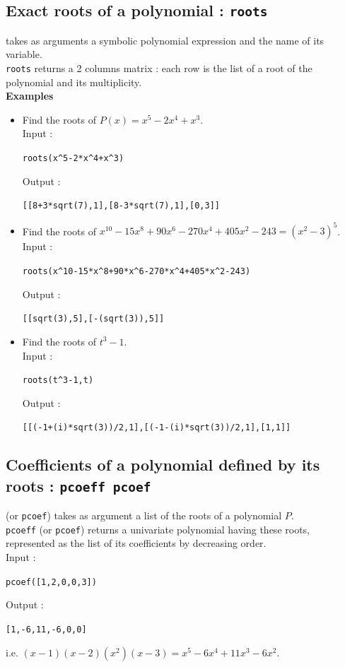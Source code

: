 \documentclass[a4paper,11pt]{book}
\begin{document}
\subsection{Exact roots of a polynomial : {\tt roots}}
 takes as arguments a symbolic
polynomial expression and the name of its variable.\\
{\tt roots} returns a 2 columns matrix : each row is 
the list of a root of the polynomial and its multiplicity.\\
{\bf Examples}
\begin{itemize}
\item Find the roots of $P(x)=x^5-2x^4+x^3$.\\
Input :
\begin{center}{\tt roots(x\verb|^|5-2*x\verb|^|4+x\verb|^|3) }\end{center}
Output :
\begin{center}{\tt [[8+3*sqrt(7),1],[8-3*sqrt(7),1],[0,3]]}\end{center}
\item  Find the roots of
$x^{10}-15x^8+90x^6-270x^4+405x^2-243=(x^2-3)^5$.\\
 Input :
\begin{center}{\tt roots(x\verb|^|10-15*x\verb|^|8+90*x\verb|^|6-270*x\verb|^|4+405*x\verb|^|2-243)}\end{center}
Output :
\begin{center}{\tt[[sqrt(3),5],[-(sqrt(3)),5]]}\end{center}
\item  Find the roots of $t^3-1$.\\
Input :
\begin{center}{\tt roots(t\verb|^|3-1,t)}\end{center}
Output :
\begin{center}{\tt[[(-1+(i)*sqrt(3))/2,1],[(-1-(i)*sqrt(3))/2,1],[1,1]]}\end{center}
\end{itemize}

\subsection{Coefficients of a polynomial defined by its roots : {\tt pcoeff pcoef}}
 (or {\tt pcoef}) takes as argument a list of
the  roots of a polynomial $P$.\\
{\tt pcoeff} (or {\tt pcoef}) returns a univariate polynomial having
these roots,
represented as the list of its coefficients by decreasing order.\\
Input :
\begin{center}{\tt pcoef([1,2,0,0,3])}\end{center}
Output :
\begin{center}{\tt [1,-6,11,-6,0,0]}\end{center}
i.e. $(x-1)(x-2)(x^2)(x-3)=x^5-6x^4+11x^3-6x^2$.
\end{document}

